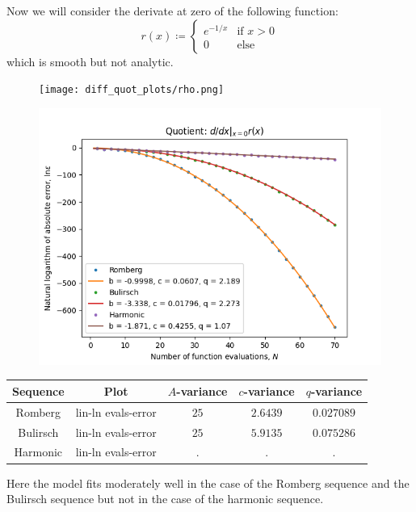 Now we will consider the derivate at zero of the following function:
\[
r(x) \coloneqq \begin{cases}
e^{-1/x} & \text{if } x > 0\\
0 & \text{else}
\end{cases}
\]
which is smooth but not analytic.

\begin{figure}[H]
\centering
\begin{minipage}{0.45\textwidth}
\centering
\texttt{[image: diff\_quot\_plots/rho.png]}
\end{minipage}
\begin{minipage}{0.45\textwidth}
\centering
\includegraphics[scale=0.45]{diff_quot_plots/rho_hp_trend.png}
\end{minipage}
\end{figure}

\begin{table}[H]
    \centering
    \begin{tabular}{c|c||c|c|c}
Sequence & Plot & \(A\)-variance & \(c\)-variance & \(q\)-variance\\\hline
Romberg & lin-ln evals-error & \(25\) & \(2.6439\) & \(0.027089\) \\
Bulirsch & lin-ln evals-error & \(25\) & \(5.9135\) & \(0.075286\) \\
Harmonic & lin-ln evals-error & . & . & . \\
    \end{tabular}
    \label{tab:my_label}
\end{table}

Here the model fits moderately well in the case of the Romberg sequence and the Bulirsch sequence but not in the case of the harmonic sequence. 

